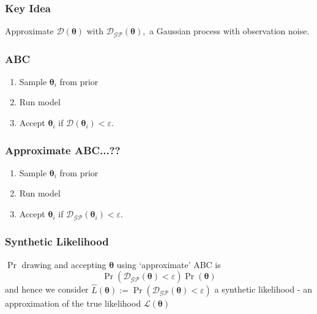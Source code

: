 \documentclass{beamer}
\begin{document}
\begin{frame}
    \frametitle{Key Idea}

    Approximate $\mathcal{D}(\bm{\theta})$ with
    $\mathcal{D}_\mathcal{GP}(\bm{\theta}),$ a Gaussian process with
    observation noise.

\end{frame}

\begin{frame}
    \frametitle{ABC}
    \begin{enumerate}
        \item Sample $\bm{\theta}_i$ from prior
        \item Run model
        \item Accept $\bm{\theta}_i$ if
              $\mathcal{D}(\bm{\theta}_i) < \varepsilon.$
    \end{enumerate}
\end{frame}

\begin{frame}
    \frametitle{Approximate ABC...??}
    \begin{enumerate}
        \item Sample $\bm{\theta}_i$ from prior
        \item Run model
        \item Accept $\bm{\theta}_i$ if
              \underline{
                  $\mathcal{D}_\mathcal{GP}(\bm{\theta}_i) < \varepsilon.$
              }
    \end{enumerate}
\end{frame}

\begin{frame}
    \frametitle{Synthetic Likelihood}

    $\Pr$ drawing and accepting $\bm{\theta}$ using
    `approximate' ABC is
    $$
        \Pr(\mathcal{D}_{\mathcal{GP}}(\bm{\theta}) < \varepsilon)
        \Pr(\bm{\theta})
    $$
    and hence we consider $\hat{L}(\bm\theta)
        := \Pr(\mathcal{D}_{\mathcal{GP}}(\bm{\theta}) < \varepsilon)$
    a synthetic
    likelihood - an approximation of the true likelihood
    $\mathcal{L}(\bm\theta)$
\end{frame}
\end{document}
